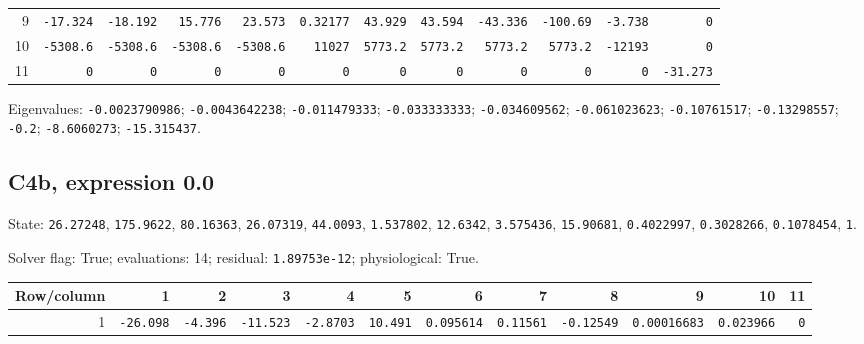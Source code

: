 \begin{landscape}
\begin{tabular}{rrrrrrrrrrrr}
9 & \texttt{-17.324} & \texttt{-18.192} & \texttt{15.776} & \texttt{23.573} & \texttt{0.32177} & \texttt{43.929} & \texttt{43.594} & \texttt{-43.336} & \texttt{-100.69} & \texttt{-3.738} & \texttt{0} \\

10 & \texttt{-5308.6} & \texttt{-5308.6} & \texttt{-5308.6} & \texttt{-5308.6} & \texttt{11027} & \texttt{5773.2} & \texttt{5773.2} & \texttt{5773.2} & \texttt{5773.2} & \texttt{-12193} & \texttt{0} \\

11 & \texttt{0} & \texttt{0} & \texttt{0} & \texttt{0} & \texttt{0} & \texttt{0} & \texttt{0} & \texttt{0} & \texttt{0} & \texttt{0} & \texttt{-31.273} \\

\bottomrule\end{tabular}\par\endgroup

{\scriptsize Eigenvalues: \texttt{-0.0023790986}; \texttt{-0.0043642238}; \texttt{-0.011479333}; \texttt{-0.033333333}; \texttt{-0.034609562}; \texttt{-0.061023623}; \texttt{-0.10761517}; \texttt{-0.13298557}; \texttt{-0.2}; \texttt{-8.6060273}; \texttt{-15.315437}.\par}

\subsection*{C4b, expression 0.0}
{\scriptsize State: \texttt{26.27248}, \texttt{175.9622}, \texttt{80.16363}, \texttt{26.07319}, \texttt{44.0093}, \texttt{1.537802}, \texttt{12.6342}, \texttt{3.575436}, \texttt{15.90681}, \texttt{0.4022997}, \texttt{0.3028266}, \texttt{0.1078454}, \texttt{1}.\par

Solver flag: True; evaluations: 14; residual: \texttt{1.89753e-12}; physiological: True.\par}

\begingroup\scriptsize\setlength{\tabcolsep}{3pt}\centering
\begin{tabular}{rrrrrrrrrrrr}\toprule

Row/column & 1 & 2 & 3 & 4 & 5 & 6 & 7 & 8 & 9 & 10 & 11 \\ \midrule

1 & \texttt{-26.098} & \texttt{-4.396} & \texttt{-11.523} & \texttt{-2.8703} & \texttt{10.491} & \texttt{0.095614} & \texttt{0.11561} & \texttt{-0.12549} & \texttt{0.00016683} & \texttt{0.023966} & \texttt{0} \\


\end{tabular}
\end{landscape}
